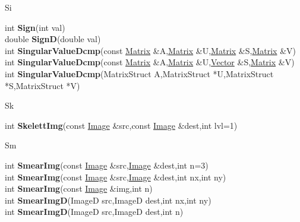 \documentclass[10pt,titlepage]{article}
\def\functionlistentry#1#2#3#4#5#6{\noindent #1 {\bf #2}(#3) \dotfill #6\\}
\def\letterref#1{}
\def\letterlabel#1{\vspace{0.5cm}\centerline{\Large #1}}
\def\letterlabelend#1{}
\begin{document}
{{\letterlabel{Si}
\letterref{A}
\letterref{B}
\letterref{C}
\letterref{D}
\letterref{E}
\letterref{F}
\letterref{G}
\letterref{H}
\letterref{I}
\letterref{K}
\letterref{L}
\letterref{M}
\letterref{N}
\letterref{O}
\letterref{P}
\letterref{Q}
\letterref{R}
\letterref{S}
\letterref{T}
\letterref{U}
\letterref{V}
\letterref{W}
\letterref{X}
\letterref{Y}
\letterref{Z}

\letterref{Sc}
\letterref{Se}
\letterref{Sh}
\letterref{Si}
\letterref{Sk}
\letterref{Sm}
\letterref{So}
\letterref{Sp}
\letterref{Sq}
\letterref{St}
\letterref{Su}
\letterlabelend{Si}
\functionlistentry{int}{Sign}{int val}{1350}{numeric}{}
\functionlistentry{double}{SignD}{double val}{1351}{numeric}{}
\functionlistentry{int}{SingularValueDcmp}{const \hyperlink{Matrix}{Matrix} \&A,\hyperlink{Matrix}{Matrix} \&U,\hyperlink{Matrix}{Matrix} \&S,\hyperlink{Matrix}{Matrix} \&V}{1131}{matrixAlgebra}{}
\functionlistentry{int}{SingularValueDcmp}{const \hyperlink{Matrix}{Matrix} \&A,\hyperlink{Matrix}{Matrix} \&U,\hyperlink{Vector}{Vector} \&S,\hyperlink{Matrix}{Matrix} \&V}{1132}{matrixAlgebra}{}
\functionlistentry{int}{SingularValueDcmp}{MatrixStruct A,MatrixStruct *U,MatrixStruct *S,MatrixStruct *V}{1135}{matrixAlgebra}{}

\letterlabel{Sk}
\letterref{A}
\letterref{B}
\letterref{C}
\letterref{D}
\letterref{E}
\letterref{F}
\letterref{G}
\letterref{H}
\letterref{I}
\letterref{K}
\letterref{L}
\letterref{M}
\letterref{N}
\letterref{O}
\letterref{P}
\letterref{Q}
\letterref{R}
\letterref{S}
\letterref{T}
\letterref{U}
\letterref{V}
\letterref{W}
\letterref{X}
\letterref{Y}
\letterref{Z}

\letterref{Sc}
\letterref{Se}
\letterref{Sh}
\letterref{Si}
\letterref{Sk}
\letterref{Sm}
\letterref{So}
\letterref{Sp}
\letterref{Sq}
\letterref{St}
\letterref{Su}
\letterlabelend{Sk}
\functionlistentry{int}{SkelettImg}{const \hyperlink{Image}{Image} \&src,const \hyperlink{Image}{Image} \&dest,int lvl=1}{389}{filter}{}

\letterlabel{Sm}
\letterref{A}
\letterref{B}
\letterref{C}
\letterref{D}
\letterref{E}
\letterref{F}
\letterref{G}
\letterref{H}
\letterref{I}
\letterref{K}
\letterref{L}
\letterref{M}
\letterref{N}
\letterref{O}
\letterref{P}
\letterref{Q}
\letterref{R}
\letterref{S}
\letterref{T}
\letterref{U}
\letterref{V}
\letterref{W}
\letterref{X}
\letterref{Y}
\letterref{Z}

\letterref{Sc}
\letterref{Se}
\letterref{Sh}
\letterref{Si}
\letterref{Sk}
\letterref{Sm}
\letterref{So}
\letterref{Sp}
\letterref{Sq}
\letterref{St}
\letterref{Su}
\letterlabelend{Sm}
\functionlistentry{int}{SmearImg}{const \hyperlink{Image}{Image} \&src,\hyperlink{Image}{Image} \&dest,int n=3}{338}{filter}{}
\functionlistentry{int}{SmearImg}{const \hyperlink{Image}{Image} \&src,\hyperlink{Image}{Image} \&dest,int nx,int ny}{339}{filter}{}
\functionlistentry{int}{SmearImg}{const \hyperlink{Image}{Image} \&img,int n}{340}{filter}{}
\functionlistentry{int}{SmearImgD}{ImageD src,ImageD dest,int nx,int ny}{341}{filter}{}
\functionlistentry{int}{SmearImgD}{ImageD src,ImageD dest,int n}{342}{filter}{}

}}
\end{document}
